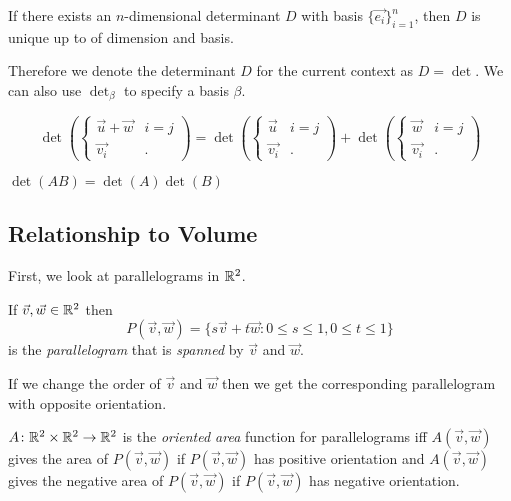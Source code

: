 \documentclass[notes]{subfiles}
\begin{document}
\begin{lemma}
    If there exists an $n$-dimensional determinant $D$ with basis $\{ \vec{e_i} \}_{i = 1}^n$, then $D$ is unique up to of dimension and basis.
\end{lemma}

Therefore we denote the determinant $D$ for the current context as $D = \det$. We can also use $\det_\beta$ to specify a basis $\beta$.

\begin{theorem}
    \[
        \det\left( \begin{cases}
            \vec{u} + \vec{w} & i = j \\
            \vec{v_i} & .
        \end{cases} \right)
        =
        \det\left( \begin{cases}
            \vec{u} & i = j \\
            \vec{v_i} & .
        \end{cases} \right)
        +
        \det\left( \begin{cases}
            \vec{w} & i = j \\
            \vec{v_i} & .
        \end{cases} \right)
    \]
\end{theorem}

\begin{lemma}
    $\det(AB) = \det(A)\det(B)$
\end{lemma}

\subsection{Relationship to Volume}
First, we look at parallelograms in $\mathbb{R}^2$.

\begin{definition}[Parallelogram]
    If $\vec{v}, \vec{w} \in \mathbb{R}^2$ then
    \[
        P(\vec{v}, \vec{w}) = \{ s\vec{v} + t\vec{w} : 0 \leq s \leq 1, 0 \leq t \leq 1 \}
    \]
    is the \textit{parallelogram} that is \textit{spanned} by $\vec{v}$ and $\vec{w}$.
\end{definition}

If we change the order of $\vec{v}$ and $\vec{w}$ then we get the corresponding parallelogram with opposite orientation.

\begin{definition}
    $A\colon \mathbb{R}^2 \times \mathbb{R}^2 \to \mathbb{R}^2$ is the \textit{oriented area} function for parallelograms iff $A(\vec{v}, \vec{w})$ gives the area of $P(\vec{v}, \vec{w})$ if $P(\vec{v}, \vec{w})$ has positive orientation and $A(\vec{v}, \vec{w})$ gives the negative area of $P(\vec{v}, \vec{w})$ if $P(\vec{v}, \vec{w})$ has negative orientation.
\end{definition}
\end{document}
